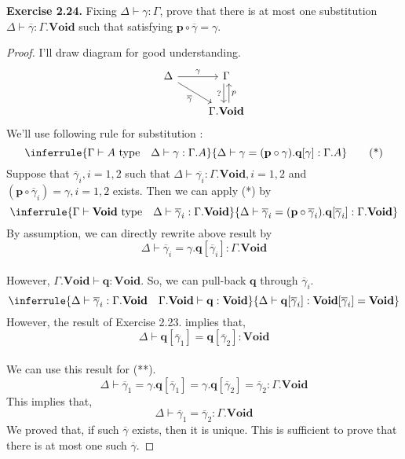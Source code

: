 \documentclass[12pt, letterpaper]{amsart}
\theoremstyle{definition}
\theoremstyle{remark}
\theoremstyle{plain}
\numberwithin{equation}{section}
\begin{document}
\textbf{Exercise 2.24.} Fixing $\Delta \vdash \gamma : \Gamma$, prove that there is at most one substitution $\Delta \vdash \overline{\gamma} : \Gamma.\mathbf{Void}$ such that satisfying $\mathbf{p} \circ \overline{\gamma} = \gamma$. 
\begin{proof}
I'll draw diagram for good understanding. 
\[
\begin{tikzcd}
    \Delta \arrow[r, "\gamma"] \arrow[rd, "\overline{\gamma}"']& \Gamma \arrow[d, "?"', shift right]
    \\ & \Gamma.\mathbf{Void} \arrow[u, "p"', shift right]
\end{tikzcd}
\]
We'll use following rule for substitution : 
\[
\inferrule
{
    \Gamma \vdash A \text{ type} \quad \Delta \vdash \gamma : \Gamma.A 
}
{
    \Delta \vdash \gamma = (\mathbf{p} \circ \gamma).\mathbf{q}[\gamma] : \Gamma.A
}
\tag{*}
\]
Suppose that $\overline{\gamma}_i, i = 1, 2$ such that $\Delta \vdash \overline{\gamma_i} : \Gamma.\mathbf{Void}, i = 1,2$ and $(\mathbf{p} \circ \overline{\gamma}_i) = \gamma, i = 1, 2$ exists. 
Then we can apply (*) by 
\[
\inferrule
{
    \Gamma \vdash \mathbf{Void} \text{ type} \quad \Delta \vdash \overline{\gamma}_i : \Gamma.\mathbf{Void}
}
{
    \Delta \vdash \overline{\gamma}_i = (\mathbf{p} \circ \overline{\gamma}_i).\mathbf{q}[\overline{\gamma}_i] : \Gamma.\mathbf{Void}
}
\]
By assumption, we can directly rewrite above result by 
\[\Delta \vdash \overline{\gamma}_i = \gamma.\mathbf{q}[\overline{\gamma}_i] : \Gamma.\mathbf{Void}\tag{**}\]
\\
However, $\Gamma.\mathbf{Void} \vdash \mathbf{q} : \mathbf{Void}$. So, we can pull-back $\mathbf{q}$ through $\overline{\gamma}_i$. 
\[
\inferrule
{
    \Delta \vdash \overline{\gamma}_i : \Gamma.\mathbf{Void} \quad \Gamma.\mathbf{Void} \vdash \mathbf{q} : \mathbf{Void}
}
{
    \Delta \vdash \mathbf{q}[\overline{\gamma}_i] : \mathbf{Void}[\overline{\gamma}_i] = \mathbf{Void}
}
\]
However, the result of Exercise 2.23. implies that, 
\[\Delta \vdash \mathbf{q}[\overline{\gamma}_1] = \mathbf{q}[\overline{\gamma}_2] : \mathbf{Void}\]
\\
We can use this result for (**). 
\[\Delta \vdash \overline{\gamma}_1 = \gamma.\mathbf{q}[\overline{\gamma}_1] = \gamma.\mathbf{q}[\overline{\gamma}_2] = \overline{\gamma}_2 : \Gamma.\mathbf{Void}\]
This implies that, 
\[\Delta \vdash \overline{\gamma}_1 = \overline{\gamma}_2 : \Gamma.\mathbf{Void}\]
We proved that, if such $\overline{\gamma}$ exists, then it is unique. This is sufficient to prove that 
there is at most one such $\overline{\gamma}$. 

\end{proof}
\end{document}
